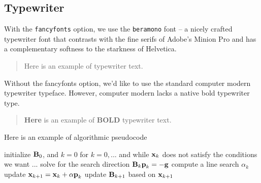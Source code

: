 \documentclass[longtitle,sidenotes,nofonts]{dgleich-article}
\begin{document}
\subsection{Typewriter}

With the \verb#fancyfonts# option, 
we use the \verb#beramono# font -- a nicely crafted typewriter font that contrasts
with the fine serifs of Adobe's Minion Pro and has a complementary softness
to the starkness of Helvetica.  

\begin{quote}
\ttfamily 
Here is an example of typewriter text.
\end{quote}

Without the fancyfonts option, we'd like to use the standard computer modern
typewriter typeface.  However, computer modern lacks a native bold typewriter type.  
\begin{quote}
 \ttfamily
\textbf{Here} is an example of \textbf{BOLD} typewriter text.
\end{quote}

Here is an example of algorithmic pseudocode
\begin{pseudocode}
initialize $\boldsymbol{\mathrm{B}}_0$, and $k = 0$
for $k=0, ...$ and while $\boldsymbol{\mathrm{x}}_k$ does not satisfy the conditions we want ...
  solve for the search direction $\boldsymbol{\mathrm{B}}_k \boldsymbol{\mathrm{p}}_k = -\boldsymbol{\mathrm{g}}$
  compute a line search $\alpha_k$
  update $\boldsymbol{\mathrm{x}}_{k+1} = \boldsymbol{\mathrm{x}}_{k} + \alpha \boldsymbol{\mathrm{p}}_k$
  update $\boldsymbol{\mathrm{B}}_{k+1}$ based on $\boldsymbol{\mathrm{x}}_{k+1}$
\end{pseudocode}
\end{document}
